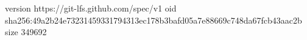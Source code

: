 version https://git-lfs.github.com/spec/v1
oid sha256:49a2b24e73231459331794313ec178b3bafd05a7e88669c748da67fcb43aac2b
size 349692
